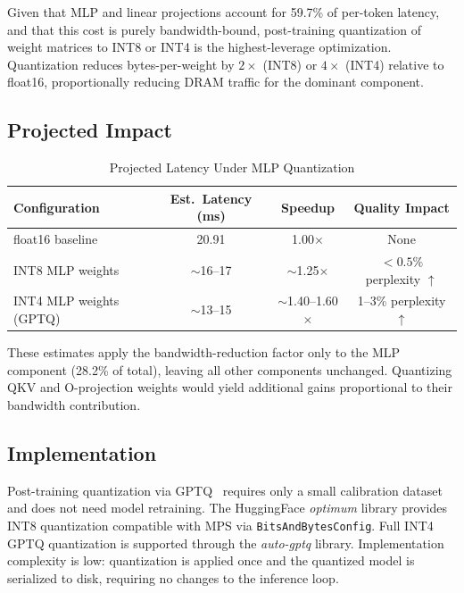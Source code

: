 \documentclass[conference]{IEEEtran}
\begin{document}
Given that MLP and linear projections account for 59.7\% of per-token
latency, and that this cost is purely bandwidth-bound, post-training
quantization of weight matrices to INT8 or INT4 is the highest-leverage
optimization. Quantization reduces bytes-per-weight by $2\times$ (INT8)
or $4\times$ (INT4) relative to float16, proportionally reducing DRAM
traffic for the dominant component.

\subsection{Projected Impact}

\begin{table}[!t]
  \centering
  \caption{Projected Latency Under MLP Quantization}
  \label{tab:opt}
  \begin{tabular}{lccc}
    \toprule
    \textbf{Configuration} & \textbf{Est.\ Latency (ms)} & \textbf{Speedup} & \textbf{Quality Impact} \\
    \midrule
    float16 baseline        & 20.91        & 1.00$\times$             & None \\
    INT8 MLP weights        & $\sim$16--17 & $\sim$1.25$\times$       & ${<}0.5\%$ perplexity $\uparrow$ \\
    INT4 MLP weights (GPTQ) & $\sim$13--15 & $\sim$1.40--1.60$\times$ & 1--3\% perplexity $\uparrow$ \\
    \bottomrule
  \end{tabular}
\end{table}

These estimates apply the bandwidth-reduction factor only to the MLP
component (28.2\% of total), leaving all other components unchanged.
Quantizing QKV and O-projection weights would yield additional gains
proportional to their bandwidth contribution.

\subsection{Implementation}

Post-training quantization via GPTQ~\cite{frantar2022} requires only a
small calibration dataset and does not need model retraining. The
HuggingFace \textit{optimum} library provides INT8 quantization compatible
with MPS via \texttt{BitsAndBytesConfig}. Full INT4 GPTQ quantization is
supported through the \textit{auto-gptq} library. Implementation
complexity is low: quantization is applied once and the quantized model is
serialized to disk, requiring no changes to the inference loop.
\end{document}
